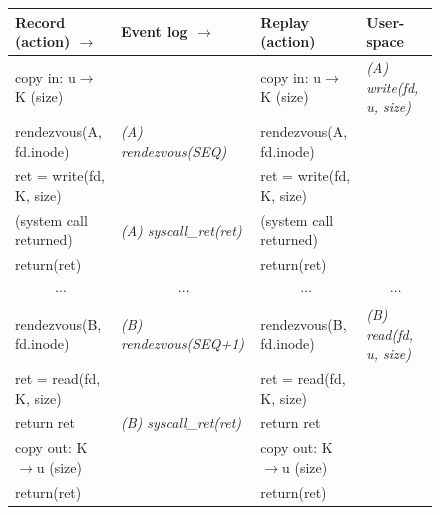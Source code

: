 \begin{table}[]
\begin{figure}[t]
  \small
  \begin{center}
  \begin{tabular}{lll|l}

    \hline	

    {\bf Record (action) \hfill $\rightarrow$ }
      & {\bf Event log \hfill $\rightarrow$ }
        & {\bf Replay (action)}
          & {\bf User-space}
            \\

    \hline	

    copy in: u$\rightarrow$K (size)
      &
        & copy in: u$\rightarrow$K (size)
          & {\em (A) write(fd, u, size)}
            \\

    rendezvous(A, fd.inode)
      & {\em (A) rendezvous(SEQ)}
        & rendezvous(A, fd.inode)
          &
            \\

    ret = write(fd, K, size)
      &
        & ret = write(fd, K, size)
          &
            \\

    (system call returned)
      & {\em (A) syscall\_ret(ret)}
        & (system call returned)
          &
            \\

    return(ret)
      &
        & return(ret)
          &
            \\

    \multicolumn{1}{c}{ $\cdots$}
      & \multicolumn{1}{c}{ $\cdots$}
        & \multicolumn{1}{c}{ $\cdots$}
          & \multicolumn{1}{|c}{ $\cdots$}
            \\

    rendezvous(B, fd.inode)
      & {\em (B) rendezvous(SEQ+1)}
        & rendezvous(B, fd.inode)
          & {\em (B) read(fd, u, size)}
            \\

    ret = read(fd, K, size)
      &
        & ret = read(fd, K, size)
          &
            \\

    return ret
      & {\em (B) syscall\_ret(ret)}
        & return ret
          &
            \\

    copy out: K$\rightarrow$u (size)
      &
        & copy out: K$\rightarrow$u (size)
          &
            \\

    return(ret)
      &
        & return(ret)
          &
            \\


\end{tabular}
\end{center}
\end{figure}
\end{table}
